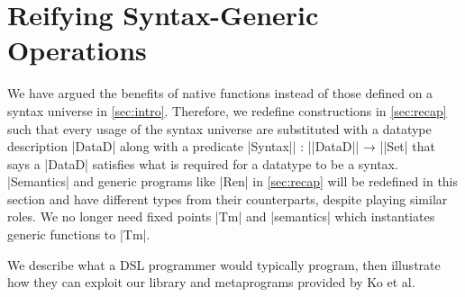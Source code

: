 \documentclass[sigplan,review,fleqn]{acmart}
\renewcommand{\verb}{\collectverb{\color{AgdaFunction}}}
\newcommand{\name}{\collectverb{\it}}
\begin{document}
\section{Reifying Syntax-Generic Operations}
\label{sec:demo}
We have argued the benefits of native functions instead of those defined on a syntax universe in \cref{sec:intro}.
Therefore, we redefine constructions in \cref{sec:recap} such that every usage of the syntax universe are substituted with a datatype description \verb|DataD| along with a predicate \verb|Syntax|\name| : |\verb|DataD|\name| → |\verb|Set| that says a \verb|DataD| satisfies what is required for a datatype to be a syntax.
\verb|Semantics| and generic programs like \verb|Ren| in \cref{sec:recap} will be redefined in this section and have different types from their counterparts, despite playing similar roles.
We no longer need fixed points \verb|Tm| and \verb|semantics| which instantiates generic functions to \verb|Tm|.

We describe what a DSL programmer would typically program, then illustrate how they can exploit our library and metaprograms provided by Ko et al.
\end{document}
